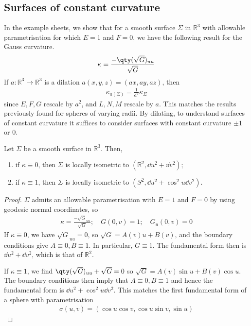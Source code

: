 \subsection{Surfaces of constant curvature}
In the example sheets, we show that for a smooth surface $\Sigma$ in $\mathbb R^3$ with allowable parametrisation for which $E = 1$ and $F = 0$, we have the following result for the Gauss curvature.
\begin{align*}
	\kappa = \frac{-\qty(\sqrt{G})_{uu}}{\sqrt{G}}
\end{align*}
If $a \colon \mathbb R^3 \to \mathbb R^3$ is a dilation $a(x,y,z) = (ax,ay,az)$, then
\begin{align*}
	\kappa_{a(\Sigma)} = \frac{1}{a^2} \kappa_\Sigma
\end{align*}
since $E, F, G$ rescale by $a^2$, and $L, N, M$ rescale by $a$.
This matches the results previously found for spheres of varying radii.
By dilating, to understand surfaces of constant curvature it suffices to consider surfaces with constant curvature $\pm 1$ or 0.
\begin{proposition}
	Let $\Sigma$ be a smooth surface in $\mathbb R^3$.
	Then,
	\begin{enumerate}
		\item if $\kappa \equiv 0$, then $\Sigma$ is locally isometric to $(\mathbb R^2, \dd{u^2} + \dd{v}^2)$;
		\item if $\kappa \equiv 1$, then $\Sigma$ is locally isometric to $(S^2, \dd{u}^2 + \cos^2 u \dd{v}^2)$.
	\end{enumerate}
\end{proposition}
\begin{proof}
	$\Sigma$ admits an allowable parametrisation with $E = 1$ and $F = 0$ by using geodesic normal coordinates, so
	\begin{align*}
		\kappa = \frac{-\sqrt{G}_{uu}}{\sqrt{G}};\quad G(0,v) = 1;\quad G_u(0,v) = 0
	\end{align*}
	If $\kappa \equiv 0$, we have $\sqrt{G}_{uu} = 0$, so $\sqrt{G} = A(v) u + B(v)$, and the boundary conditions give $A \equiv 0, B \equiv 1$.
	In particular, $G \equiv 1$.
	The fundamental form then is $\dd{u}^2 + \dd{v}^2$, which is that of $\mathbb R^2$.

	If $\kappa \equiv 1$, we find $\qty(\sqrt{G})_{uu} + \sqrt{G} = 0$ so $\sqrt{G} = A(v) \sin u + B(v) \cos u$.
	The boundary conditions then imply that $A \equiv 0, B \equiv 1$ and hence the fundamental form is $\dd{u}^2 + \cos^2 u \dd{v}^2$.
	This matches the first fundamental form of a sphere with parametrisation
	\begin{align*}
		\sigma(u,v) = (\cos u \cos v, \cos u \sin v, \sin u)
	\end{align*}
\end{proof}
